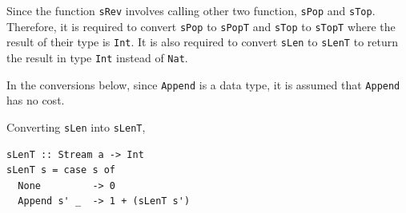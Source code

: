 \documentclass[12pt]{article}
\newcommand{\haskell}{\texttt}
\begin{document}
Since the function \haskell{sRev} involves calling other two function, \haskell{sPop} and \haskell{sTop}. Therefore, it is required to convert \haskell{sPop} to \haskell{sPopT} and \haskell{sTop} to \haskell{sTopT} where the result of their type is \haskell{Int}. It is also required to convert \haskell{sLen} to \haskell{sLenT} to return the result in type \haskell{Int} instead of \haskell{Nat}.

In the conversions below, since \haskell{Append} is a data type, it is assumed that \haskell{Append} has no cost.

Converting \haskell{sLen} into \haskell{sLenT},
\begin{mdframed}
\begin{verbatim}
sLenT :: Stream a -> Int
sLenT s = case s of
  None         -> 0
  Append s' _  -> 1 + (sLenT s')
\end{verbatim}
\end{mdframed}
\end{document}
